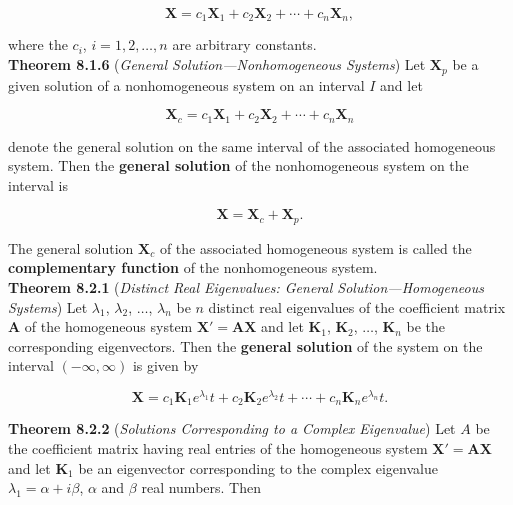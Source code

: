 \documentclass[12pt]{article}
\begin{document}
\begin{equation}
    \mathbf{X} = c_1\mathbf{X}_1 + c_2\mathbf{X}_2 + \cdots + c_n\mathbf{X}_n,
\end{equation}

\noindent where the \(c_i\), \(i = 1, 2, \ldots, n\) are arbitrary constants.\\

\noindent\textbf{Theorem 8.1.6} (\emph{General Solution—Nonhomogeneous Systems}) Let \(\mathbf{X}_p\) be a given solution of a nonhomogeneous system on an interval \(I\) and let

\begin{equation}
    \mathbf{X}_c = c_1\mathbf{X}_1 + c_2\mathbf{X}_2 + \cdots + c_n\mathbf{X}_n
\end{equation}

\noindent denote the general solution on the same interval of the associated homogeneous system. Then the \textbf{general solution} of the nonhomogeneous system on the interval is

\begin{equation}
    \mathbf{X} = \mathbf{X}_c + \mathbf{X}_p.
\end{equation}

\noindent The general solution \(\mathbf{X}_c\) of the associated homogeneous system is called the \textbf{complementary function} of the nonhomogeneous system.\\

\noindent\textbf{Theorem 8.2.1} (\emph{Distinct Real Eigenvalues: General Solution—Homogeneous Systems}) Let \(\lambda_1\), \(\lambda_2\), \(\ldots\), \(\lambda_n\) be \(n\) distinct real eigenvalues of the coefficient matrix \(\mathbf{A}\) of the homogeneous system \(\mathbf{X'} = \mathbf{AX}\) and let \(\mathbf{K}_1\), \(\mathbf{K}_2\), \(\ldots\), \(\mathbf{K}_n\) be the corresponding eigenvectors. Then the \textbf{general solution} of the system on the interval \((-\infty, \infty)\) is given by

\begin{equation}
    \mathbf{X} = c_1\mathbf{K}_1 e^{\lambda_1}t + c_2\mathbf{K}_2 e^{\lambda_2}t + \cdots + c_n\mathbf{K}_n e^{\lambda_n}t.
\end{equation}

\noindent\textbf{Theorem 8.2.2} (\emph{Solutions Corresponding to a Complex Eigenvalue}) Let \(A\) be the coefficient matrix having real entries of the homogeneous system \(\mathbf{X'} = \mathbf{AX}\) and let \(\mathbf{K}_1\) be an eigenvector corresponding to the complex eigenvalue \(\lambda_1 = \alpha + i\beta\), \(\alpha\) and \(\beta\) real numbers. Then
\end{document}
